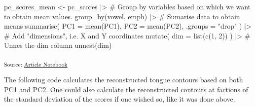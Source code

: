 \documentclass[
]{interact}
\newenvironment{Shaded}{\begin{snugshade}}{\end{snugshade}}
\newcommand{\AttributeTok}[1]{\textcolor[rgb]{0.40,0.45,0.13}{#1}}
\newcommand{\CommentTok}[1]{\textcolor[rgb]{0.37,0.37,0.37}{#1}}
\newcommand{\DecValTok}[1]{\textcolor[rgb]{0.68,0.00,0.00}{#1}}
\newcommand{\FunctionTok}[1]{\textcolor[rgb]{0.28,0.35,0.67}{#1}}
\newcommand{\NormalTok}[1]{\textcolor[rgb]{0.00,0.23,0.31}{#1}}
\newcommand{\OtherTok}[1]{\textcolor[rgb]{0.00,0.23,0.31}{#1}}
\newcommand{\SpecialCharTok}[1]{\textcolor[rgb]{0.37,0.37,0.37}{#1}}
\newcommand{\StringTok}[1]{\textcolor[rgb]{0.13,0.47,0.30}{#1}}
\begin{document}
\begin{Shaded}
\begin{Highlighting}[]
\NormalTok{pc\_scores\_mean }\OtherTok{\textless{}{-}}\NormalTok{ pc\_scores }\SpecialCharTok{|\textgreater{}}
  \CommentTok{\# Group by variables based on which we want to obtain mean values.}
  \FunctionTok{group\_by}\NormalTok{(vowel, emph) }\SpecialCharTok{|\textgreater{}} 
  \CommentTok{\# Sumarise data to obtain means}
  \FunctionTok{summarise}\NormalTok{(}
    \AttributeTok{PC1 =} \FunctionTok{mean}\NormalTok{(PC1),}
    \AttributeTok{PC2 =} \FunctionTok{mean}\NormalTok{(PC2),}
    \AttributeTok{.groups =} \StringTok{"drop"}
\NormalTok{  ) }\SpecialCharTok{|\textgreater{}} 
  \CommentTok{\# Add "dimensions", i.e. X and Y coordinates}
  \FunctionTok{mutate}\NormalTok{(}
    \AttributeTok{dim =} \FunctionTok{list}\NormalTok{(}\FunctionTok{c}\NormalTok{(}\DecValTok{1}\NormalTok{, }\DecValTok{2}\NormalTok{))}
\NormalTok{  ) }\SpecialCharTok{|\textgreater{}} 
  \CommentTok{\# Unnes the dim column}
  \FunctionTok{unnest}\NormalTok{(dim)}
\end{Highlighting}
\end{Shaded}

\textsubscript{Source:
\href{https://stefanocoretta.github.io/mv_uti/index.qmd.html}{Article
Notebook}}

The following code calculates the reconstructed tongue contours based on
both PC1 and PC2. One could also calculate the reconstructed contours at
factions of the standard deviation of the scores if one wished so, like
it was done above.
\end{document}
